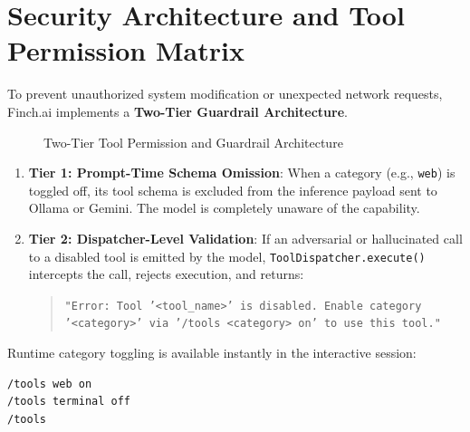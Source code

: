 \section{Security Architecture and Tool Permission Matrix}
To prevent unauthorized system modification or unexpected network requests, Finch.ai implements a \textbf{Two-Tier Guardrail Architecture}.

\begin{figure}[htbp]
\centering
{}
\caption{Two-Tier Tool Permission and Guardrail Architecture}
\label{fig:guardrail_arch}
\end{figure}

\begin{enumerate}
    \item \textbf{Tier 1: Prompt-Time Schema Omission}: When a category (e.g., \texttt{web}) is toggled off, its tool schema is excluded from the inference payload sent to Ollama or Gemini. The model is completely unaware of the capability.
    \item \textbf{Tier 2: Dispatcher-Level Validation}: If an adversarial or hallucinated call to a disabled tool is emitted by the model, \texttt{ToolDispatcher.execute()} intercepts the call, rejects execution, and returns:
    \begin{quote}
        \texttt{"Error: Tool '<tool\_name>' is disabled. Enable category '<category>' via '/tools <category> on' to use this tool."}
    \end{quote}
\end{enumerate}

Runtime category toggling is available instantly in the interactive session:
\begin{lstlisting}[language=bash]
/tools web on
/tools terminal off
/tools
\end{lstlisting}
